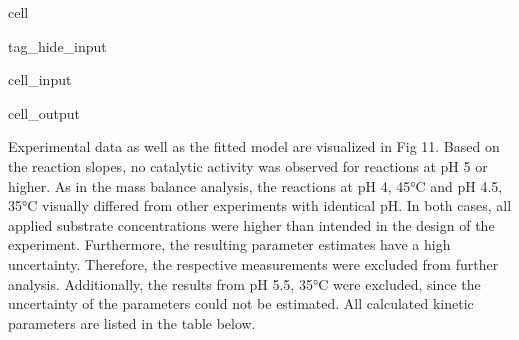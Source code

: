 \documentclass[letterpaper,12pt,english]{jupyterBook}
\begin{document}
\begin{sphinxuseclass}{cell}
\begin{sphinxuseclass}{tag_hide_input}
\begin{sphinxVerbatimInput}
\begin{sphinxuseclass}{cell_input}
\end{sphinxuseclass}\end{sphinxVerbatimInput}
\begin{sphinxVerbatimOutput}

\begin{sphinxuseclass}{cell_output}
\noindent{}

\end{sphinxuseclass}\end{sphinxVerbatimOutput}

\end{sphinxuseclass}
\end{sphinxuseclass}
\sphinxAtStartPar
{}

\sphinxAtStartPar
Experimental data as well as the fitted model are visualized in Fig 11. Based on the reaction slopes, no catalytic activity was observed for reactions at pH 5 or higher.
As in the mass balance analysis, the reactions at pH 4, 45°C and pH 4.5, 35°C visually differed from other experiments with identical pH. In both cases, all applied substrate concentrations were higher than intended in the design of the experiment. Furthermore, the resulting parameter estimates have a high uncertainty. Therefore, the respective measurements were excluded from further analysis. Additionally, the results from pH 5.5, 35°C were excluded, since the uncertainty of the parameters could not be estimated. All calculated kinetic parameters are listed in the table below.
\end{document}
